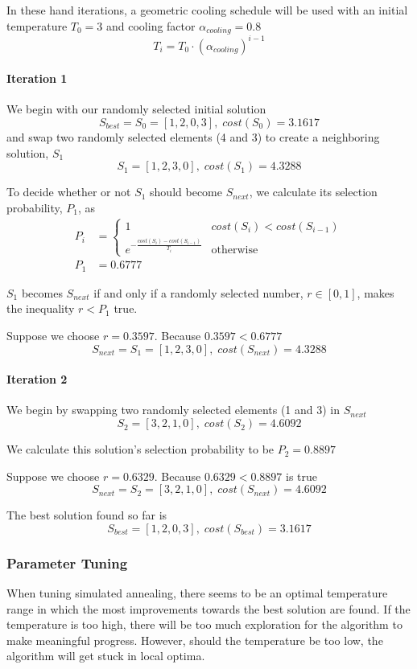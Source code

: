 \documentclass[a4paper]{article}
\newcommand{\subsubsubsection}[1]{\paragraph{#1} \mbox{}}
\begin{document}
In these hand iterations, a geometric cooling schedule will be used with an initial temperature $T_0 = 3$ and cooling factor $\alpha_\mathit{cooling} = 0.8$
$$T_i = T_0 \cdot \left( \alpha_\mathit{cooling} \right)^{i - 1}$$

\subsubsubsection{Iteration 1}

We begin with our randomly selected initial solution
$$S_\mathit{best} = S_0 = [ 1, 2, 0, 3 ], \; \mathit{cost}(S_0) = 3.1617$$
and swap two randomly selected elements (4 and 3) to create a neighboring
solution, $S_1$
$$S_1 = [ 1, 2, 3, 0 ], \; \mathit{cost}(S_1) = 4.3288$$

To decide whether or not $S_1$ should become $S_\mathit{next}$, we calculate its
selection probability, $P_1$, as
\begin{align*}
P_i & =
\begin{cases}
  1 & \mathit{cost}(S_{i}) < \mathit{cost}(S_{i - 1}) \\
  e^{-\frac{\mathit{cost}(S_{i}) - \mathit{cost}(S_{i - 1})}{T_i}} & \text{otherwise}
\end{cases} \\
P_1 & = 0.6777
\end{align*}

$S_1$ becomes $S_\mathit{next}$ if and only if a randomly selected number,
$r \in [0, 1]$, makes the inequality $r < P_1$ true.

Suppose we choose $r = 0.3597$. Because $0.3597 < 0.6777$
$$S_\mathit{next} = S_1 = [ 1, 2, 3, 0 ], \; \mathit{cost}(S_\mathit{next}) = 4.3288$$

\subsubsubsection{Iteration 2}

We begin by swapping two randomly selected elements (1 and 3) in $S_\mathit{next}$
$$S_2 = [ 3, 2, 1, 0 ], \; \mathit{cost}(S_2) = 4.6092$$

We calculate this solution's selection probability to be $P_2 = 0.8897$

Suppose we choose $r = 0.6329$. Because $0.6329 < 0.8897$ is true
$$S_\mathit{next} = S_2 = [ 3, 2, 1, 0 ], \; \mathit{cost}(S_\mathit{next}) = 4.6092$$

The best solution found so far is
$$S_\mathit{best} = [ 1, 2, 0, 3 ], \; \mathit{cost}(S_\mathit{best}) = 3.1617$$

\subsubsection{Parameter Tuning}

When tuning simulated annealing, there seems to be an optimal temperature range in which the most improvements towards the best solution are found. If the temperature is too high, there will be too much exploration for the algorithm to make meaningful progress. However, should the temperature be too low, the algorithm will get stuck in local optima.
\end{document}
